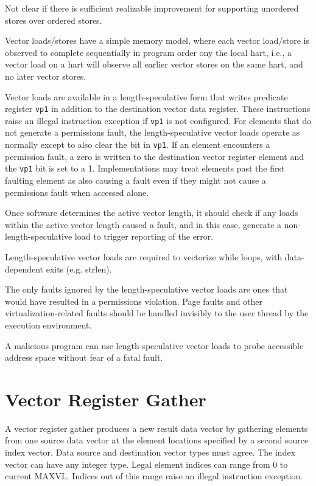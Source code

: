 \begin{discussion}
  Not clear if there is sufficient realizable improvement for
  supporting unordered stores over ordered stores.
\end{discussion}

Vector loads/stores have a simple memory model, where each vector
load/store is observed to complete sequentially in program order ony
the local hart, i.e., a vector load on a hart will observe all earlier
vector stores on the same hart, and no later vector stores.

Vector loads are available in a length-speculative form that writes
predicate register {\tt vp1} in addition to the destination vector
data register.  These instructions raise an illegal instruction
exception if {\tt vp1} is not configured.  For elements that do not
generate a permissions fault, the length-speculative vector loads
operate as normally except to also clear the bit in {\tt vp1}.  If an
element encounters a permission fault, a zero is written to the
destination vector register element and the {\tt vp1} bit is set to a
1.  Implementations may treat elements past the first faulting element
as also causing a fault even if they might not cause a permissions
fault when accessed alone.

Once software determines the active vector length, it should check if
any loads within the active vector length caused a fault, and in this
case, generate a non-length-speculative load to trigger reporting of
the error.

\begin{commentary}
  Length-speculative vector loads are required to vectorize while
  loops, with data-dependent exits (e.g. strlen).

  The only faults ignored by the length-speculative vector loads are
  ones that would have resulted in a permissions violation.  Page
  faults and other virtualization-related faults should be handled
  invisibly to the user thread by the execution environment.

  A malicious program can use length-speculative vector loads to probe
  accessible address space without fear of a fatal fault.
\end{commentary}

\section{Vector Register Gather}

A vector register gather produces a new result data vector by gathering
elements from one source data vector at the element locations
specified by a second source index vector.  Data source and
destination vector types must agree.  The index vector can have any
integer type.  Legal element indices can range from 0 to current
MAXVL.  Indices out of this range raise an illegal instruction
exception.

